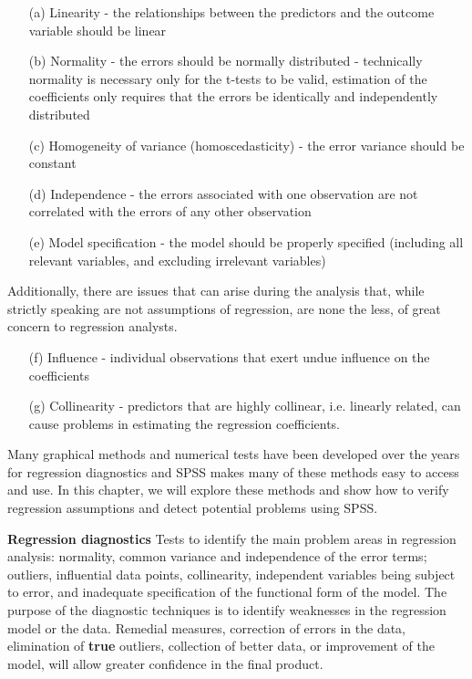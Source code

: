 \begin{itemize}

\item[(a)] Linearity - the relationships between the predictors and the outcome variable should be linear
\item[(b)]Normality - the errors should be normally distributed - technically normality is necessary only for the t-tests to be valid, estimation of the coefficients only requires that the errors be identically and independently distributed
\item[(c)]Homogeneity of variance (homoscedasticity) - the error variance should be constant
\item[(d)]Independence - the errors associated with one observation are not correlated with the errors of any other observation
\item[(e)]Model specification - the model should be properly specified (including all relevant variables, and excluding irrelevant variables)
\end{itemize}

Additionally, there are issues that can arise during the analysis that, while strictly speaking are not assumptions of regression, are none the less, of great concern to regression analysts.
\begin{itemize}
\item[(f)]Influence - individual observations that exert undue influence on the coefficients
\item[(g)]Collinearity - predictors that are highly collinear, i.e. linearly related, can cause problems in estimating the regression coefficients.
\end{itemize}
Many graphical methods and numerical tests have been developed over the years for regression diagnostics and SPSS makes many of these methods easy to access and use. In this chapter, we will explore these methods and show how to verify regression assumptions and detect potential problems using SPSS.






\textbf{Regression diagnostics} Tests to identify the main problem areas in regression analysis: normality, common variance and independence of the error terms; outliers, influential data points, collinearity, independent variables being subject to error, and inadequate specification of the functional form of the model. The purpose of the diagnostic techniques is to identify weaknesses in the regression model or the data. Remedial measures, correction of errors in the data, elimination of \textbf{true} outliers, collection of better data, or improvement of the model, will allow greater confidence in the final product.

